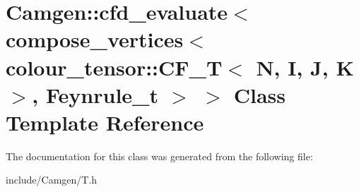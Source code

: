 \hypertarget{a00054}{\section{Camgen\-:\-:cfd\-\_\-evaluate$<$ compose\-\_\-vertices$<$ colour\-\_\-tensor\-:\-:C\-F\-\_\-\-T$<$ N, I, J, K $>$, Feynrule\-\_\-t $>$ $>$ Class Template Reference}
\label{a00054}
}


The documentation for this class was generated from the following file\-:\begin{DoxyCompactItemize}
\item 
include/\-Camgen/T.\-h\end{DoxyCompactItemize}
